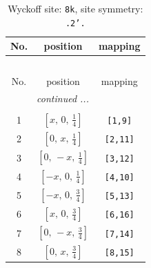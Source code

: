 \documentclass[fleqn,8pt]{jsarticle}
\begin{document}
\begin{longtable}{ccc}
\caption{Wyckoff site: {\tt 8k}, site symmetry: {\tt .2'.}}
 \\
 \hline \hline
No. & position & mapping \\ \hline \endfirsthead

\multicolumn{2}{l}{\tablename\ \thetable{}} \\
 \hline \hline
No. & position & mapping \\ \hline \endhead

 \hline \hline
\multicolumn{2}{r}{\footnotesize\it continued ...} \\ \endfoot

 \hline \hline
\multicolumn{2}{r}{} \\ \endlastfoot

1 & $\left[ x,\, 0,\, \frac{1}{4} \right]$ & {\tt [1,9]} \\ \hline
2 & $\left[ 0,\, x,\, \frac{1}{4} \right]$ & {\tt [2,11]} \\ \hline
3 & $\left[ 0,\, - x,\, \frac{1}{4} \right]$ & {\tt [3,12]} \\ \hline
4 & $\left[ - x,\, 0,\, \frac{1}{4} \right]$ & {\tt [4,10]} \\ \hline
5 & $\left[ - x,\, 0,\, \frac{3}{4} \right]$ & {\tt [5,13]} \\ \hline
6 & $\left[ x,\, 0,\, \frac{3}{4} \right]$ & {\tt [6,16]} \\ \hline
7 & $\left[ 0,\, - x,\, \frac{3}{4} \right]$ & {\tt [7,14]} \\ \hline
8 & $\left[ 0,\, x,\, \frac{3}{4} \right]$ & {\tt [8,15]} \\
\end{longtable}
\renewcommand{\arraystretch}{1.2}
\end{document}
